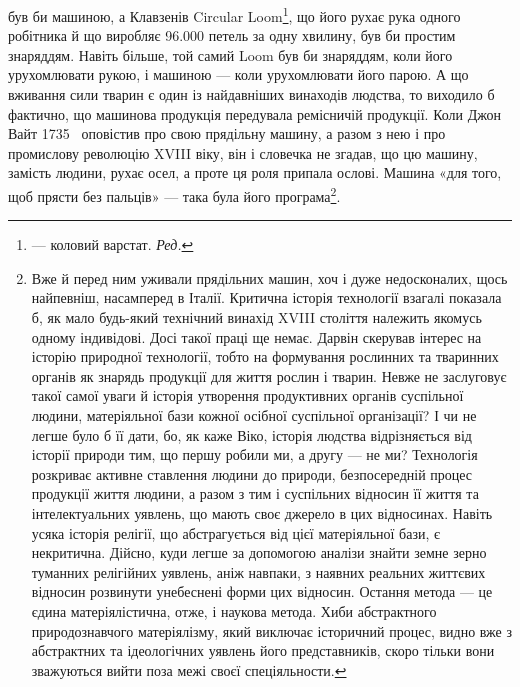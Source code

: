 \parcont{}  %
був би машиною, а Клавзенів Circular Loom\footnote*{
— коловий варстат. \emph{Ред.}
}, що його рухає
рука одного робітника й що виробляє \num{96.000} петель за одну хвилину,
був би простим знаряддям. Навіть більше, той самий Loom
був би знаряддям, коли його урухомлювати рукою, і машиною —
коли урухомлювати його парою. А що вживання сили тварин є
один із найдавніших винаходів людства, то виходило б фактично,
що машинова продукція передувала ремісничій продукції. Коли
Джон Вайт 1735~ оповістив про свою прядільну машину, а
разом з нею і про промислову революцію XVIII віку, він і словечка
не згадав, що цю машину, замість людини, рухає осел, а
проте ця роля припала ослові. Машина «для того, щоб прясти
без пальців» — така була його програма\footnote{
Вже й перед ним уживали прядільних машин, хоч і дуже недосконалих,
щось найпевніш, насамперед в Італії. Критична історія технології
взагалі показала б, як мало будь-який технічний винахід XVIII століття
належить якомусь одному індивідові. Досі такої праці ще немає. Дарвін
скерував інтерес на історію природної технології, тобто на формування
рослинних та тваринних органів як знарядь продукції для життя рослин і
тварин. Невже не заслуговує такої самої уваги й історія утворення
продуктивних органів суспільної людини, матеріяльної бази кожної
осібної суспільної організації? І чи не легше було б її дати, бо, як каже
Віко, історія людства відрізняється від історії природи тим, що першу
робили ми, а другу — не ми? Технологія розкриває активне ставлення
людини до природи, безпосередній процес продукції життя людини, а
разом з тим і суспільних відносин її життя та інтелектуальних уявлень,
що мають своє джерело в цих відносинах. Навіть усяка історія релігії,
що абстрагується від цієї матеріяльної бази, є некритична. Дійсно,
куди легше за допомогою аналізи знайти земне зерно туманних релігійних
уявлень, аніж навпаки, з наявних реальних життєвих відносин розвинути
унебеснені форми цих відносин. Остання метода — це єдина матеріялістична,
отже, і наукова метода. Хиби абстрактного природознавчого
матеріялізму, який виключає історичний процес, видно вже з абстрактних
та ідеологічних уявлень його представників, скоро тільки вони зважуються
вийти поза межі своєї спеціяльности.
}.

